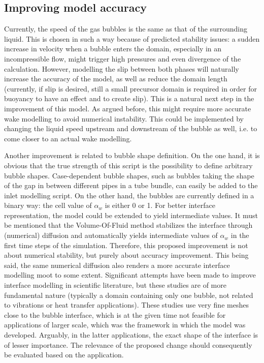 \documentclass[fleqn,10pt,a4paper,twoside,english]{book}
\begin{document}
\subsection{Improving model accuracy}
\par Currently, the speed of the gas bubbles is the same as that of the surrounding liquid. This is chosen in such a way because of predicted stability issues: a sudden increase in velocity when a bubble enters the domain, especially in an incompressible flow, might trigger high pressures and even divergence of the calculation. However, modelling the slip between both phases will naturally increase the accuracy of the model, as well as reduce the domain length (currently, if slip is desired, still a small precursor domain is required in order for buoyancy to have an effect and to create slip). This is a natural next step in the improvement of this model. As argued before, this might require more accurate wake modelling to avoid numerical instability. This could be implemented by changing the liquid speed upstream and downstream of the bubble as well, i.e. to come closer to an actual wake modelling. 
\par Another improvement is related to bubble shape definition. On the one hand, it is obvious that the true strength of this script is the possibility to define arbitrary bubble shapes. Case-dependent bubble shapes, such as bubbles taking the shape of the gap in between different pipes in a tube bundle, can easily be added to the inlet modelling script. On the other hand, the bubbles are currently defined in a binary way: the cell value of $\alpha_{w}$ is either 0 or 1. For better interface representation, the model could be extended to yield intermediate values. It must be mentioned that the Volume-Of-Fluid method stabilizes the interface through (numerical) diffusion and automatically yields intermediate values of $\alpha_{w}$ in the first time steps of the simulation. Therefore, this proposed improvement is not about numerical stability, but purely about accuracy improvement. This being said, the same numerical diffusion also renders a more accurate interface modelling moot to some extent. Significant attempts have been made to improve interface modelling in scientific literature, but these studies are of more fundamental nature (typically a domain containing only one bubble, not related to vibrations or heat transfer applications). These studies use very fine meshes close to the bubble interface, which is at the given time not feasible for applications of larger scale, which was the framework in which the model was developed.  Arguably, in the latter applications, the exact shape of the interface is of lesser importance. The relevance of the proposed change should consequently be evaluated based on the application.
\end{document}
